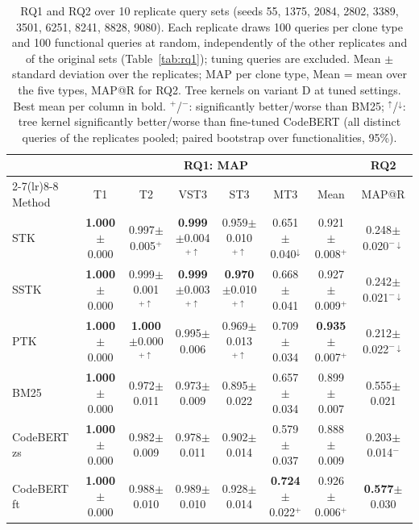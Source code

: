\begin{table}[t]
\centering
\caption{RQ1 and RQ2 over 10 replicate query sets (seeds 55, 1375, 2084, 2802, 3389, 3501, 6251, 8241, 8828, 9080). Each replicate draws 100 queries per clone type and 100 functional queries at random, independently of the other replicates and of the original sets (Table~\ref{tab:rq1}); tuning queries are excluded. Mean $\pm$ standard deviation over the replicates; MAP per clone type, Mean = mean over the five types, MAP@R for RQ2. Tree kernels on variant D at tuned settings. Best mean per column in bold. $^{+}$/$^{-}$: significantly better/worse than BM25; $^{\uparrow}$/$^{\downarrow}$: tree kernel significantly better/worse than fine-tuned CodeBERT (all distinct queries of the replicates pooled; paired bootstrap over functionalities, 95\%).}
\label{tab:rq1rep}
\footnotesize
\setlength{\tabcolsep}{3.5pt}
\begin{tabular}{lccccccc}
\toprule
 & \multicolumn{6}{c}{RQ1: MAP} & RQ2 \\ \cmidrule(lr){2-7}\cmidrule(lr){8-8}
Method & T1 & T2 & VST3 & ST3 & MT3 & Mean & MAP@R \\
\midrule
STK & \textbf{1.000}$\pm$0.000 & 0.997$\pm$0.005$^{+}$ & \textbf{0.999}$\pm$0.004$^{+\uparrow}$ & 0.959$\pm$0.010$^{+\uparrow}$ & 0.651$\pm$0.040$^{\downarrow}$ & 0.921$\pm$0.008$^{+}$ & 0.248$\pm$0.020$^{-\downarrow}$ \\
SSTK & \textbf{1.000}$\pm$0.000 & 0.999$\pm$0.001$^{+\uparrow}$ & \textbf{0.999}$\pm$0.003$^{+\uparrow}$ & \textbf{0.970}$\pm$0.010$^{+\uparrow}$ & 0.668$\pm$0.041 & 0.927$\pm$0.009$^{+}$ & 0.242$\pm$0.021$^{-\downarrow}$ \\
PTK & \textbf{1.000}$\pm$0.000 & \textbf{1.000}$\pm$0.000$^{+\uparrow}$ & 0.995$\pm$0.006 & 0.969$\pm$0.013$^{+\uparrow}$ & 0.709$\pm$0.034 & \textbf{0.935}$\pm$0.007$^{+}$ & 0.212$\pm$0.022$^{-\downarrow}$ \\
\midrule
BM25 & \textbf{1.000}$\pm$0.000 & 0.972$\pm$0.011 & 0.973$\pm$0.009 & 0.895$\pm$0.022 & 0.657$\pm$0.034 & 0.899$\pm$0.007 & 0.555$\pm$0.021 \\
CodeBERT zs & \textbf{1.000}$\pm$0.000 & 0.982$\pm$0.009 & 0.978$\pm$0.011 & 0.902$\pm$0.014 & 0.579$\pm$0.037 & 0.888$\pm$0.009 & 0.203$\pm$0.014$^{-}$ \\
CodeBERT ft & \textbf{1.000}$\pm$0.000 & 0.988$\pm$0.010 & 0.989$\pm$0.010 & 0.928$\pm$0.014 & \textbf{0.724}$\pm$0.022$^{+}$ & 0.926$\pm$0.006$^{+}$ & \textbf{0.577}$\pm$0.030 \\
\bottomrule
\end{tabular}
\end{table}

